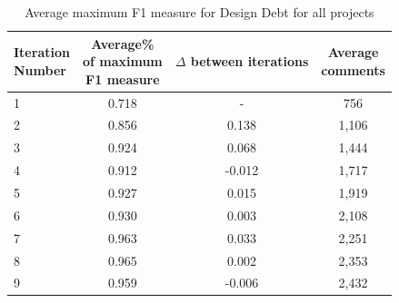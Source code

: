 \begin{table}[!thb]
    \begin{center}
        \caption{Average maximum F1 measure for Design Debt  for all projects}
        \label{tbl:design_iteration_performance}
        \begin{tabular}{l| c c c}
        \toprule
        \thead{Iteration\\Number} & \thead{Average\%\\of maximum\\F1 measure} & \thead{$\Delta$\\between\\iterations} & \thead{Average\\comments} \\
        \midrule
         1  &  0.718 &  -      & 756   \\  
         2  &  0.856 &  0.138  & 1,106 \\  
         3  &  0.924 &  0.068  & 1,444 \\  
         4  &  0.912 & -0.012  & 1,717 \\  
         5  &  0.927 &  0.015  & 1,919 \\  
         6  &  0.930 &  0.003  & 2,108 \\  
         7  &  0.963 &  0.033  & 2,251 \\  
         8  &  0.965 &  0.002  & 2,353 \\  
         9  &  0.959 & -0.006  & 2,432 \\  
        \bottomrule
        \end{tabular}
    \end{center}    
\end{table}

